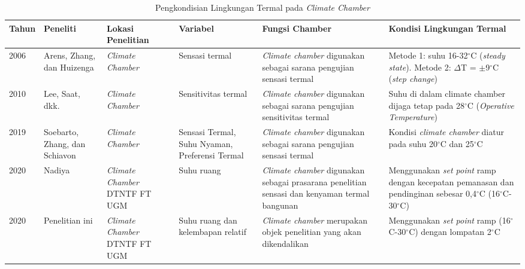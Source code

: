 \begin{landscape}
	\begin{table}[t]
		\caption{Pengkondisian Lingkungan Termal pada \textit{Climate Chamber}}
		\centering
		\label{tbl:2:studichamber}
		\begin{tabular}{|p{1cm}|p{2.6cm}|p{3cm}|p{3cm}|p{6cm}|p{5.5cm}|}
			\hline
			Tahun & Peneliti & Lokasi Penelitian & Variabel & Fungsi Chamber & Kondisi Lingkungan Termal \\ \hline
			
			2006 \cite{paper21Arens} & Arens, Zhang, dan Huizenga & \textit{Climate Chamber} & Sensasi termal & \textit{Climate chamber} digunakan sebagai sarana pengujian sensasi termal & Metode 1: suhu 16-32$^{\circ}$C (\textit{steady state}). Metode 2: $\Delta$T = $\pm$9$^{\circ}$C (\textit{step change}) \\ \hline
			
			2010 \cite{paper21JYLee} & Lee, Saat, dkk. &\textit{Climate Chamber} & Sensitivitas termal & \textit{Climate chamber} digunakan sebagai sarana pengujian sensitivitas termal & Suhu di dalam climate chamber dijaga tetap pada 28$^{\circ}$C (\textit{Operative Temperature}) \\ \hline
			
			2019 \cite{paper21Veronica} & Soebarto, Zhang, dan Schiavon &\textit{Climate Chamber} & Sensasi Termal, Suhu Nyaman, Preferensi Termal & \textit{Climate chamber} digunakan sebagai sarana pengujian sensasi termal & Kondisi \textit{climate chamber} diatur pada suhu 20$^\circ$C dan 25$^\circ$C \\ \hline
			
			2020 \cite{skripsiMuna} & Nadiya & \textit{Climate Chamber} DTNTF FT UGM & Suhu ruang & \textit{Climate chamber} digunakan sebagai prasarana penelitian sensasi dan kenyaman termal bangunan & Menggunakan \textit{set point} ramp dengan kecepatan pemanasan dan pendinginan sebesar 0,4$^{\circ}$C (16$^{\circ}$C-30$^{\circ}$C)\\ \hline
			
			2020 & Penelitian ini & \textit{Climate Chamber} DTNTF FT UGM & Suhu ruang dan kelembapan relatif & \textit{Climate chamber} merupakan objek penelitian yang akan dikendalikan & Menggunakan \textit{set point} ramp (16$^{\circ}$C-30$^{\circ}$C) dengan lompatan 2$^{\circ}$C\\ \hline
		\end{tabular}
	\end{table}
\end{landscape}

